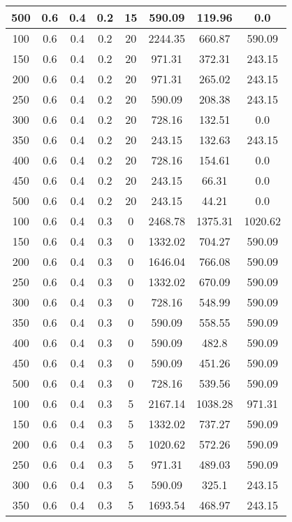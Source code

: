 \documentclass[a4paper, 12pt]{extreport}
\begin{document}
\begin{itemize}
\begin{longtable}{|c|c|c|c|c|c|c|c|}
			500 & 0.6 & 0.4 & 0.2 & 15 & 590.09 & 119.96 & 0.0 \\\hline
			100 & 0.6 & 0.4 & 0.2 & 20 & 2244.35 & 660.87 & 590.09 \\\hline
			150 & 0.6 & 0.4 & 0.2 & 20 & 971.31 & 372.31 & 243.15 \\\hline
			200 & 0.6 & 0.4 & 0.2 & 20 & 971.31 & 265.02 & 243.15 \\\hline
			250 & 0.6 & 0.4 & 0.2 & 20 & 590.09 & 208.38 & 243.15 \\\hline
			300 & 0.6 & 0.4 & 0.2 & 20 & 728.16 & 132.51 & 0.0 \\\hline
			350 & 0.6 & 0.4 & 0.2 & 20 & 243.15 & 132.63 & 243.15 \\\hline
			400 & 0.6 & 0.4 & 0.2 & 20 & 728.16 & 154.61 & 0.0 \\\hline
			450 & 0.6 & 0.4 & 0.2 & 20 & 243.15 & 66.31 & 0.0 \\\hline
			500 & 0.6 & 0.4 & 0.2 & 20 & 243.15 & 44.21 & 0.0 \\\hline
			100 & 0.6 & 0.4 & 0.3 & 0 & 2468.78 & 1375.31 & 1020.62 \\\hline
			150 & 0.6 & 0.4 & 0.3 & 0 & 1332.02 & 704.27 & 590.09 \\\hline
			200 & 0.6 & 0.4 & 0.3 & 0 & 1646.04 & 766.08 & 590.09 \\\hline
			250 & 0.6 & 0.4 & 0.3 & 0 & 1332.02 & 670.09 & 590.09 \\\hline
			300 & 0.6 & 0.4 & 0.3 & 0 & 728.16 & 548.99 & 590.09 \\\hline
			350 & 0.6 & 0.4 & 0.3 & 0 & 590.09 & 558.55 & 590.09 \\\hline
			400 & 0.6 & 0.4 & 0.3 & 0 & 590.09 & 482.8 & 590.09 \\\hline
			450 & 0.6 & 0.4 & 0.3 & 0 & 590.09 & 451.26 & 590.09 \\\hline
			500 & 0.6 & 0.4 & 0.3 & 0 & 728.16 & 539.56 & 590.09 \\\hline
			100 & 0.6 & 0.4 & 0.3 & 5 & 2167.14 & 1038.28 & 971.31 \\\hline
			150 & 0.6 & 0.4 & 0.3 & 5 & 1332.02 & 737.27 & 590.09 \\\hline
			200 & 0.6 & 0.4 & 0.3 & 5 & 1020.62 & 572.26 & 590.09 \\\hline
			250 & 0.6 & 0.4 & 0.3 & 5 & 971.31 & 489.03 & 590.09 \\\hline
			300 & 0.6 & 0.4 & 0.3 & 5 & 590.09 & 325.1 & 243.15 \\\hline
			350 & 0.6 & 0.4 & 0.3 & 5 & 1693.54 & 468.97 & 243.15 \\\hline

\end{longtable}
\end{itemize}
\end{document}
